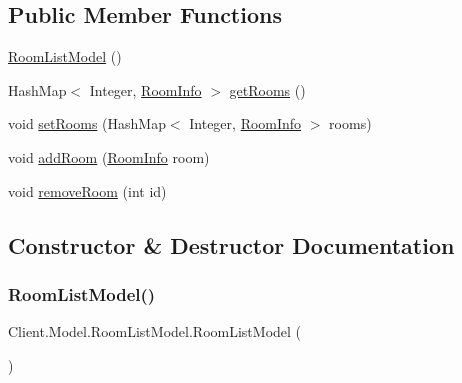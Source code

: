 \subsection*{Public Member Functions}
\begin{DoxyCompactItemize}
\item 
\mbox{\hyperlink{classClient_1_1Model_1_1RoomListModel_a1738a460af89d76a66bd9c62651d5d6e}{Room\+List\+Model}} ()
\item 
Hash\+Map$<$ Integer, \mbox{\hyperlink{classCommon_1_1RoomInfo}{Room\+Info}} $>$ \mbox{\hyperlink{classClient_1_1Model_1_1RoomListModel_a10a966393e0d06de3742a372023f5ff3}{get\+Rooms}} ()
\item 
void \mbox{\hyperlink{classClient_1_1Model_1_1RoomListModel_a1927f5b273c8b47f2e9f72fe7480b8a0}{set\+Rooms}} (Hash\+Map$<$ Integer, \mbox{\hyperlink{classCommon_1_1RoomInfo}{Room\+Info}} $>$ rooms)
\item 
void \mbox{\hyperlink{classClient_1_1Model_1_1RoomListModel_ae57d201334439d5a28c8f6e889d91a7f}{add\+Room}} (\mbox{\hyperlink{classCommon_1_1RoomInfo}{Room\+Info}} room)
\item 
void \mbox{\hyperlink{classClient_1_1Model_1_1RoomListModel_a73e2d5942607d4a014a96c74adaa7f2e}{remove\+Room}} (int id)
\end{DoxyCompactItemize}


\subsection{Constructor \& Destructor Documentation}
\mbox{\label{classClient_1_1Model_1_1RoomListModel_a1738a460af89d76a66bd9c62651d5d6e}} 
\subsubsection{\texorpdfstring{Room\+List\+Model()}{RoomListModel()}}
{\footnotesize\ttfamily Client.\+Model.\+Room\+List\+Model.\+Room\+List\+Model (\begin{DoxyParamCaption}{ }\end{DoxyParamCaption})\hspace{0.3cm}{\ttfamily [inline]}}



